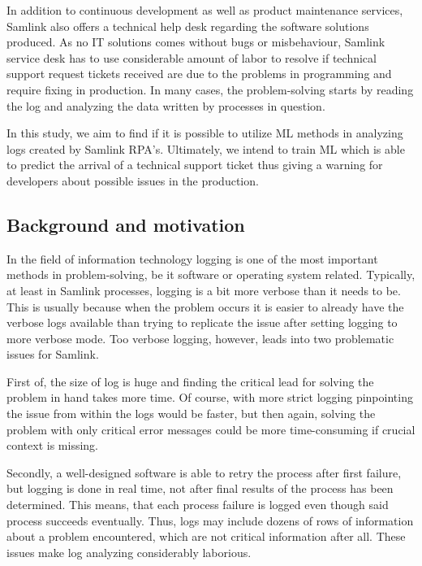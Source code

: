 In addition to continuous development
as well as product maintenance services,
Samlink also offers a technical help desk
regarding the software solutions produced.
As no IT solutions comes without bugs or misbehaviour,
Samlink service desk has to use considerable amount of labor
to resolve if technical support request tickets received
are due to the problems in programming
and require fixing in production.
In many cases,
the problem-solving starts by reading the log
and analyzing the data written by processes in question.

In this study,
we aim to find if it is possible to utilize
ML methods in analyzing logs
created by Samlink RPA's.
Ultimately,
we intend to train ML
which is able to predict the arrival of a technical support ticket
thus giving a warning for developers about possible issues
in the production.



\subsection{Background and motivation}\label{subsec:intro-background-and-motivation}
In the field of information technology
logging is one of the most important methods
in problem-solving,
be it software or operating system related.\cite{delarosa2018log}
Typically,
at least in Samlink processes,
logging is a bit more verbose
than it needs to be.
This is usually because when the problem occurs
it is easier to already have the verbose logs available
than trying to replicate the issue
after setting logging to more verbose mode.
Too verbose logging, however,
leads into two problematic issues for Samlink.

First of, the size of log is huge
and finding the critical lead for
solving the problem in hand
takes more time.
Of course,
with more strict logging
pinpointing the issue from within the logs
would be faster,
but then again,
solving the problem with only critical error messages
could be more time-consuming
if crucial context is missing.

Secondly,
a well-designed software
is able to retry the process after first failure,
but logging is done in real time,
not after final results of the process has been determined.
This means,
that each process failure is logged
even though said process succeeds eventually.
Thus,
logs may include dozens of rows of information about a problem encountered,
which are not critical information after all.
These issues make log analyzing considerably laborious.

